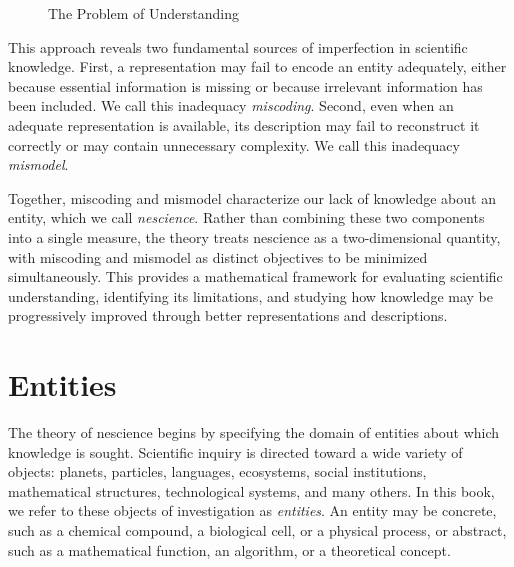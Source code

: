 \begin{figure}[t]
\centering
{}
\caption{\label{fig:representationProblem} The Problem of Understanding}
\end{figure}

This approach reveals two fundamental sources of imperfection in scientific knowledge. First, a representation may fail to encode an entity adequately, either because essential information is missing or because irrelevant information has been included. We call this inadequacy \emph{miscoding}. Second, even when an adequate representation is available, its description may fail to reconstruct it correctly or may contain unnecessary complexity. We call this inadequacy \emph{mismodel}.

Together, miscoding and mismodel characterize our lack of knowledge about an entity, which we call \emph{nescience}. Rather than combining these two components into a single measure, the theory treats nescience as a two-dimensional quantity, with miscoding and mismodel as distinct objectives to be minimized simultaneously. This provides a mathematical framework for evaluating scientific understanding, identifying its limitations, and studying how knowledge may be progressively improved through better representations and descriptions.

%
%

\section{Entities}

The theory of nescience begins by specifying the domain of entities about which knowledge is sought. Scientific inquiry is directed toward a wide variety of objects: planets, particles, languages, ecosystems, social institutions, mathematical structures, technological systems, and many others. In this book, we refer to these objects of investigation as \emph{entities}. An entity may be concrete, such as a chemical compound, a biological cell, or a physical process, or abstract, such as a mathematical function, an algorithm, or a theoretical concept.

